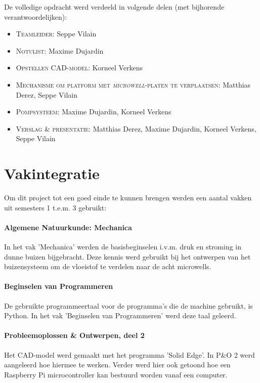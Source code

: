 \documentclass[a4paper,twoside,kulak]{kulakreport} %
\begin{document}
De volledige opdracht werd verdeeld in volgende delen (met bijhorende verantwoordelijken):
\begin{itemize}
	\item \textsc{Teamleider:} Seppe Vilain
	\item \textsc{Notulist}: Maxime Dujardin
	\item \textsc{Opstellen CAD-model}: Korneel Verkens
	\item \textsc{Mechanisme om platform met \textit{microwell}-platen te verplaatsen:} Matthias Derez, Seppe Vilain
	\item \textsc{Pompsysteem:} Maxime Dujardin, Korneel Verkens
	\item \textsc{Verslag \& presentatie:} Matthias Derez, Maxime Dujardin, Korneel Verkens, Seppe Vilain
	
\end{itemize}

\clearpage

\section*{Vakintegratie}
Om dit project tot een goed einde te kunnen brengen werden een aantal vakken uit semesters 1 t.e.m. 3 gebruikt:

\paragraph{Algemene Natuurkunde: Mechanica}

In het vak 'Mechanica' werden de basisbeginselen i.v.m. druk en stroming in dunne buizen bijgebracht. Deze kennis werd gebruikt bij het ontwerpen van het buizensysteem om de vloeistof te verdelen naar de acht microwells.

\paragraph{Beginselen van Programmeren}

De gebruikte programmeertaal voor de programma's die de machine gebruikt, is Python. In het vak 'Beginselen van Programmeren' werd deze taal geleerd. 

\paragraph{Probleemoplossen \& Ontwerpen, deel 2}

Het CAD-model werd gemaakt met het programma 'Solid Edge'. In P\&O 2 werd aangeleerd hoe hiermee te werken. Verder werd hier ook getoond hoe een Raspberry Pi microcontroller kan bestuurd worden vanaf een computer. 
\end{document}
